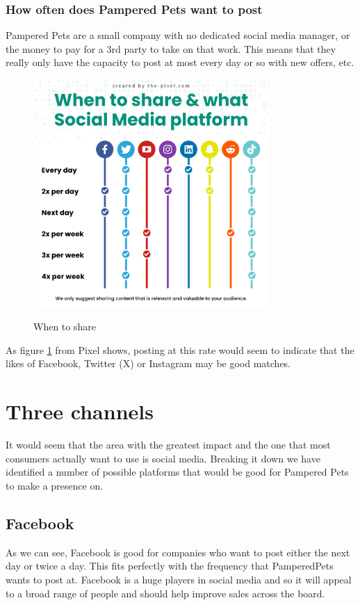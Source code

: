 \documentclass{article}
\begin{document}
\subsubsection{How often does Pampered Pets want to post}
Pampered Pets are a small company with no dedicated social media manager, or the money to pay for a 3rd party to take on that work. 
This means that they really only have the capacity to post at most every day or so with new offers, etc. 
\begin{figure}[ht]
    \caption{When to share}
    \centering
    \includegraphics[width=0.8\textwidth]{sharing-on-social-media-channels}
    \label{fig:days}
    \end{figure}
    \FloatBarrier
 As figure \ref{fig:days} from Pixel \cite{pixel} shows, posting at this rate would seem to indicate that the likes of Facebook, Twitter (X) or Instagram may be good matches.

 \section{Three channels}
 It would seem that the area with the greatest impact and the one that most consumers actually want to use is social media.
 Breaking it down we have identified a number of possible platforms that would be good for Pampered Pets to make a presence on.
 \subsection{Facebook}
 As we can see, Facebook is good for companies who want to post either the next day or twice a day. This fits perfectly with the frequency that PamperedPets wants to post at.
Facebook is a huge players in social media and so it will appeal to a broad range of people and should help improve sales across the board.
\end{document}
